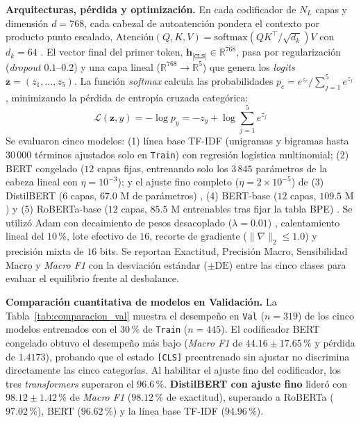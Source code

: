 \documentclass[letterpaper, 10 pt, conference]{ieeeconf}
\makeatletter
\def\section{\@startsection{section}{1}{\z@}{0.60ex plus 0.15ex minus 0.1ex}{0.15ex plus 0.05ex minus 0ex}{\normalfont\normalsize\centering\scshape}}
\makeatother
\begin{document}
\textbf{Arquitecturas, pérdida y optimización.}
En cada codificador de $N_L$ capas y dimensión $d = 768$, cada cabezal de autoatención pondera el contexto por producto punto escalado, $\text{Atención}(Q, K, V) = \text{softmax}(QK^\top/\sqrt{d_k})V$ con $d_k = 64$ \cite{c2}. El vector final del primer token, $\mathbf{h}_{\texttt{[CLS]}} \in \mathbb{R}^{768}$, pasa por regularización (\textit{dropout} $0.1\text{--}0.2$) y una capa lineal ($\mathbb{R}^{768} \to \mathbb{R}^5$) que genera los \textit{logits} $\mathbf{z} = (z_1, \dots, z_5)$. La función \textit{softmax} calcula las probabilidades $p_c = e^{z_c}/\sum_{j=1}^5 e^{z_j}$, minimizando la pérdida de entropía cruzada categórica:
\begin{equation}
\mathcal{L}(\mathbf{z}, y) = -\log p_y = -z_y + \log\sum_{j=1}^{5} e^{z_j}
\label{eq:ce}
\end{equation}
Se evaluaron cinco modelos: (1) línea base TF-IDF (unigramas y bigramas hasta $30\,000$ términos ajustados solo en \texttt{Train}) con regresión logística multinomial; (2) BERT congelado ($12$ capas fijas, entrenando solo los $3\,845$ parámetros de la cabeza lineal con $\eta = 10^{-3}$); y el ajuste fino completo ($\eta = 2\times 10^{-5}$) de (3) DistilBERT ($6$ capas, $67.0\text{ M}$ de parámetros) \cite{c5}, (4) BERT-base ($12$ capas, $109.5\text{ M}$) \cite{c3} y (5) RoBERTa-base ($12$ capas, $85.5\text{ M}$ entrenables tras fijar la tabla BPE) \cite{c4}. Se utilizó Adam con decaimiento de pesos desacoplado ($\lambda = 0.01$) \cite{c7}, calentamiento lineal del $10\,\%$, lote efectivo de $16$, recorte de gradiente ($\|\nabla\|_2 \le 1.0$) y precisión mixta de $16$ bits. Se reportan Exactitud, Precisión Macro, Sensibilidad Macro y \textit{Macro F1} con la desviación estándar ($\pm\text{DE}$) entre las cinco clases para evaluar el equilibrio frente al desbalance.

\section{Resultados}

\textbf{Comparación cuantitativa de modelos en Validación.}
La Tabla~\ref{tab:comparacion_val} muestra el desempeño en \texttt{Val} ($n = 319$) de los cinco modelos entrenados con el $30\,\%$ de \texttt{Train} ($n = 445$). El codificador BERT congelado obtuvo el desempeño más bajo (\textit{Macro F1} de $44.16 \pm 17.65\,\%$ y pérdida de $1.4173$), probando que el estado \texttt{[CLS]} preentrenado sin ajustar no discrimina directamente las cinco categorías. Al habilitar el ajuste fino del codificador, los tres \textit{transformers} superaron el $96.6\,\%$. \textbf{DistilBERT con ajuste fino} lideró con $98.12 \pm 1.42\,\%$ de \textit{Macro F1} ($98.12\,\%$ de exactitud), superando a RoBERTa ($97.02\,\%$), BERT ($96.62\,\%$) y la línea base TF-IDF ($94.96\,\%$).
\end{document}
